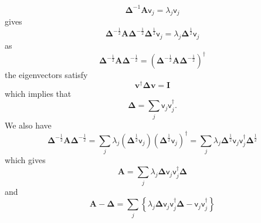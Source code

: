 \documentclass[aps,preprint]{revtex4}%
\begin{document}
\begin{equation}
\mathbf{\Delta}^{-1}\mathbf{A}\mathsf{v}_{j}=\lambda_{j}\mathsf{v}_{j}%
\end{equation}
gives%
\begin{equation}
\mathbf{\Delta}^{-\frac{1}{2}}\mathbf{A\Delta}^{-\frac{1}{2}}\mathbf{\Delta
}^{\frac{1}{2}}\mathsf{v}_{j}=\lambda_{j}\mathbf{\Delta}^{\frac{1}{2}%
}\mathsf{v}_{j}%
\end{equation}
as
\begin{equation}
\mathbf{\Delta}^{-\frac{1}{2}}\mathbf{A\Delta}^{-\frac{1}{2}}=\left(
\mathbf{\Delta}^{-\frac{1}{2}}\mathbf{A\Delta}^{-\frac{1}{2}}\right)
^{\dagger}%
\end{equation}
the eigenvectors satisfy%
\begin{equation}
\mathbf{v}^{\dagger}\mathbf{\Delta v=I}%
\end{equation}
which implies that
\begin{equation}
\mathbf{\Delta}=\sum_{j}\mathsf{v}_{j}\mathsf{v}_{j}^{\dagger}.
\end{equation}
We also have
\begin{equation}
\mathbf{\Delta}^{-\frac{1}{2}}\mathbf{A\Delta}^{-\frac{1}{2}}=\sum_{j}%
\lambda_{j}\left(  \mathbf{\Delta}^{\frac{1}{2}}\mathsf{v}_{j}\right)  \left(
\mathbf{\Delta}^{\frac{1}{2}}\mathsf{v}_{j}\right)  ^{\dagger}=\sum_{j}%
\lambda_{j}\mathbf{\Delta}^{\frac{1}{2}}\mathsf{v}_{j}\mathsf{v}_{j}^{\dagger
}\mathbf{\Delta}^{\frac{1}{2}}%
\end{equation}
which gives
\begin{equation}
\mathbf{A=}\sum_{j}\lambda_{j}\mathbf{\Delta}\mathsf{v}_{j}\mathsf{v}%
_{j}^{\dagger}\mathbf{\Delta}%
\end{equation}
and
\begin{equation}
\mathbf{A-\Delta=}\sum_{j}\left\{  \lambda_{j}\mathbf{\Delta}\mathsf{v}%
_{j}\mathsf{v}_{j}^{\dagger}\mathbf{\Delta-}\mathsf{v}_{j}\mathsf{v}%
_{j}^{\dagger}\right\}
\end{equation}
\end{document}

